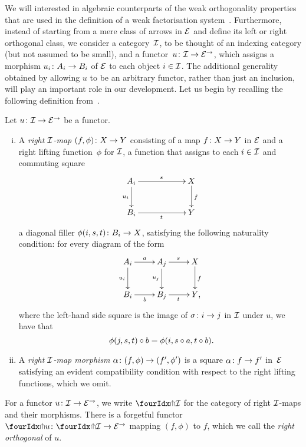 \documentclass[reqno,10pt,a4paper,oneside,draft]{amsart}
\begin{document}
We will interested in algebraic counterparts of the weak orthogonality properties that are used in the definition of a weak factorisation system~\cite{bousfield-wfs}.
Furthermore, instead of starting from a mere class of arrows in $\catE$ and define its left or right orthogonal class, we consider a category~$\cal{I}$, to be thought of an indexing category (but not assumed to be small), and a functor~$u \co \cal{I} \to \catE^\to$, which assigns a morphism $u_i \co A_i \to B_i$ of $\catE$ to each object $i \in \cal{I}$.
The additional generality obtained by allowing $u$ to be an arbitrary functor, rather than just an inclusion, will play an important role in our development.
Let us begin by recalling the following definition from~\cite{garner:small-object-argument}.


\begin{definition}
Let $u \co \cal{I} \to \catE^\to$ be a functor.
\begin{enumerate}[(i)]
\item A \emph{right $\cal{I}$-map} $(f, \phi) \co X \to Y$ consisting of a map $f \co X \to Y$ in $\cal{E}$ and a right lifting function~$\phi$ for $\cal{I}$, \ie a function that assigns to each $i \in \cal{I}$ and commuting square
\[
\xymatrix@C=2cm{
A_i \ar[r]^{s} \ar[d]_{u_i} & X \ar[d]^f \\
B_i \ar[r]_{t} & Y}
\]
a diagonal filler $\phi(i,s, t) \co B_i \to X$, satisfying the following naturality condition: for every diagram of the form
\[
\xymatrix{
A_i \ar[r]^a \ar[d]_{u_i} & A_j \ar[r]^{s} \ar[d]_{u_j} & X \ar[d]^f \\
B_i \ar[r]_{b} & B_j \ar[r]_{t} & Y \rlap{,}}
\]
where the left-hand side square is the image of $\sigma \co i \to j$ in $\cal{I}$ under $u$, we have that
\[
\phi(j, s, t) \cc b = \phi(i, s \cc a, t \cc b) \rlap{.}
\]
\item A \emph{right $\cal{I}$-map morphism} $\alpha \co (f, \phi) \to (f', \phi')$ is a square $\alpha \co f \to f'$ in~$\catE$ satisfying an evident compatibility condition with respect to the right lifting functions, which we omit.
\end{enumerate}
\end{definition}

For a functor $u \co \cal{I} \to \catE^\to$, we write $\liftr{\cal{I}}$ for the category of right $\cal{I}$-maps and their morphisms.
There is a forgetful functor~$\liftr{u} \co \liftr{\cal{I}} \to \catE^\to$ mapping $(f, \phi)$ to $f$, which we call the \emph{right orthogonal} of $u$.
\end{document}

